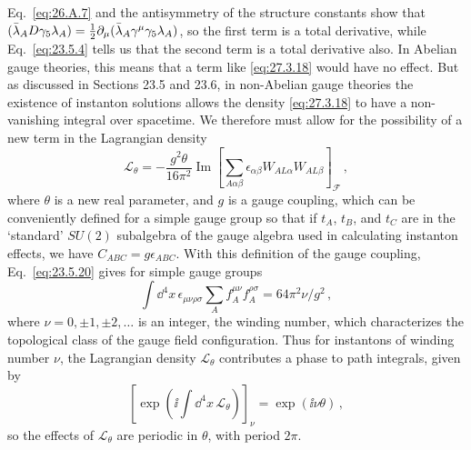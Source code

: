 Eq.~\eqref{eq:26.A.7} and the antisymmetry of the structure constants
show that
\((\bar\lambda_A\sl{D}\gamma_5\lambda_A)
=\tfrac12\partial_\mu(\bar\lambda_A\gamma^\mu\gamma_5\lambda_A)\),
so the first term is a total derivative, while Eq.~\eqref{eq:23.5.4}
tells us that the second term is a total derivative also. In Abelian gauge
theories, this means that a term like \eqref{eq:27.3.18} would have no
effect. But as discussed in Sections 23.5 and 23.6, in non-Abelian gauge
theories the existence of instanton solutions allows the density
\eqref{eq:27.3.18} to have a non-vanishing integral over spacetime. We
therefore must allow for the possibility of a new term in the Lagrangian
density
\begin{equation}
  \mathcal{L}_\theta
  =-\frac{g^2\theta}{16\pi^2}
  \operatorname{Im}\left[
    \sum_{A\alpha\beta}
    \epsilon_{\alpha\beta}W_{AL\alpha}W_{AL\beta}
  \right]_{\mathcal{F}}\,,
  \tag{27.3.19}\label{eq:27.3.19}
\end{equation}
where \(\theta\) is a new real parameter, and \(g\) is a gauge coupling,
which can be conveniently defined for a simple gauge group so that if
\(t_A\), \(t_B\), and \(t_C\) are in the `standard' \(SU(2)\) subalgebra
of the gauge algebra used in calculating instanton effects, we have
\(C_{ABC}=g\epsilon_{ABC}\). With this definition of the gauge coupling,
Eq.~\eqref{eq:23.5.20} gives for simple gauge groups
\begin{equation}
  \int \dd^4x\,\epsilon_{\mu\nu\rho\sigma}
  \sum_A f_A^{\mu\nu}f_A^{\rho\sigma}
  =64\pi^2\nu/g^2\,,
  \tag{27.3.20}\label{eq:27.3.20}
\end{equation}
where \(\nu=0,\mathbin{\pm}1,\mathbin{\pm}2,\ldots\) is an integer, the
winding number, which characterizes the topological class of the gauge
field configuration. Thus for instantons of winding number \(\nu\), the
Lagrangian density \(\mathcal{L}_\theta\) contributes a phase to path
integrals, given by
\begin{equation}
  \left[
    \exp\left(\ii\int \dd^4x\,\mathcal{L}_\theta\right)
  \right]_\nu
  =\exp(\ii\nu\theta)\,,
  \tag{27.3.21}\label{eq:27.3.21}
\end{equation}
so the effects of \(\mathcal{L}_\theta\) are periodic in \(\theta\), with
period \(2\pi\).

